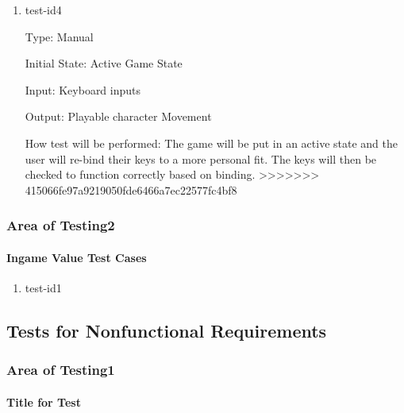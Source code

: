 \documentclass[12pt, titlepage]{article}
\begin{document}
\begin{enumerate}
\item{test-id4\\}

Type: Manual

Initial State: Active Game State 

Input: Keyboard inputs

Output: Playable character Movement

How test will be performed: The game will be put in an active state and the user will re-bind their keys to a more personal fit. The keys will then be checked to function correctly based on binding. 
>>>>>>> 415066fe97a9219050fde6466a7ec22577fc4bf8

\end{enumerate}

\subsubsection{Area of Testing2}

\paragraph{Ingame Value Test Cases}

\begin{enumerate}

\item{test-id1\\}

\end{enumerate}

\subsection{Tests for Nonfunctional Requirements}

\subsubsection{Area of Testing1}
		
\paragraph{Title for Test}
\end{document}
